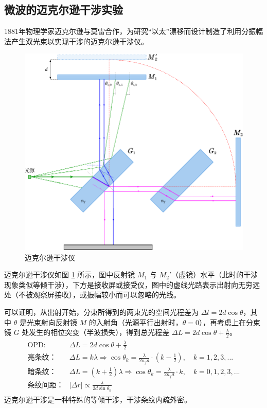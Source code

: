 \documentclass[UTF8]{article}
\theoremstyle{MyLineTheoremStyle} %
\theoremstyle{MyBlockTheoremStyle} %
\theoremstyle{MySubsubsectionStyle} %
\begin{document}
\subsection{微波的迈克尔逊干涉实验}
1881年物理学家迈克尔逊与莫雷合作，为研究“以太”漂移而设计制造了利用分振幅法产生双光束以实现干涉的迈克尔逊干涉仪。

\begin{figure}[H]\centering
\includegraphics[width=0.85\columnwidth]{assets/迈克尔逊干涉仪.pdf}
\caption{迈克尔逊干涉仪}\label{迈克尔逊干涉仪}
\end{figure}

迈克尔逊干涉仪如图 \ref{迈克尔逊干涉仪} 所示，图中反射镜 $M_1$ 与 $M_2'$（虚镜）水平（此时的干涉现象类似等倾干涉），下方是接收屏或接受仪，图中的虚线光路表示出射向无穷远处（不被观察屏接收），或振幅较小而可以忽略的光线。

可以证明，从出射开始，分束所得到的两束光的空间光程差为 $\Delta l = 2 d \cos \theta$，其中 $\theta$ 是光束射向反射镜 $M$ 的入射角（光源平行出射时，$\theta = 0$），再考虑上在分束镜 $G$ 处发生的相位突变（半波损失），得到总光程差 $\Delta L = 2 d \cos \theta + \frac{\lambda}{2}$。
\begin{align}
\begin{matrix}
\displaystyle \text{OPD: }& \Delta L = 2 d \cos \theta + \frac{\lambda}{2} \\ 
\displaystyle \text{亮条纹：}&\Delta L = k \lambda \Longrightarrow \cos \theta_k = \frac{\lambda}{2 n_f d} \cdot (k - \frac{1}{2}),\quad k = 1, 2, 3, ... \\ 
\displaystyle \text{暗条纹：}&\Delta L = (k + \frac{1}{2}) \lambda \Longrightarrow \cos \theta_k = \frac{\lambda}{2 n_f d} \cdot k,\quad k = 0, 1, 2, 3, ...\\ 
\displaystyle \text{条纹间距：}& | \Delta r | \propto  \frac{\lambda}{2d \sin \theta_k}
\end{matrix}
\end{align}
迈克尔逊干涉是一种特殊的等倾干涉，干涉条纹内疏外密。
\end{document}
